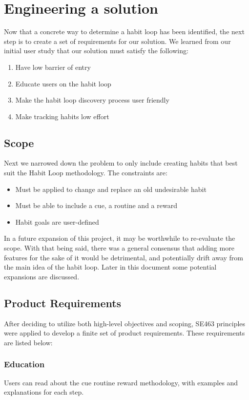 \section{Engineering a solution}
Now that a concrete way to determine a habit loop has been identified, the next step is to create a set of requirements for our solution. We learned from our initial user study that our solution must satisfy the following:

\begin{enumerate}
    \item Have low barrier of entry
    \item Educate users on the habit loop
    \item Make the habit loop discovery process user friendly
    \item Make tracking habits low effort
\end{enumerate}

\subsection{Scope}
Next we narrowed down the problem to only include creating habits that best suit the Habit Loop methodology. The constraints are:


\begin{itemize}
    \item Must be applied to change and replace an old undesirable habit
    \item Must be able to include a cue, a routine and a reward
    \item Habit goals are user-defined
\end{itemize}

In a future expansion of this project, it may be worthwhile to re-evaluate the scope. With that being said, there was a general consensus that adding more features for the sake of it would be detrimental, and potentially drift away from the main idea of the habit loop. Later in this document some potential expansions are discussed.

\subsection{Product Requirements}
After deciding to utilize both high-level objectives and scoping, SE463 principles were applied to develop a finite set of product requirements. These requirements are listed below:
\subsubsection{Education}
Users can read about the cue routine reward methodology, with examples and explanations for each step.
